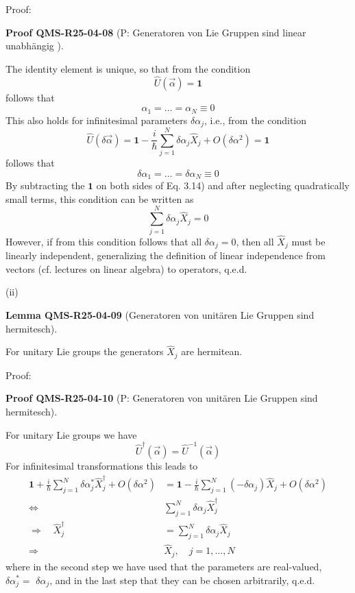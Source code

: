 \documentclass[10pt, letterpaper]{article}
\newcommand{\CustomHeading}[3]{%
  \par\medskip\noindent%
  \textbf{#1 #2} \textnormal{(#3)}.\enskip%
}
\newenvironment{LEM}[2]{\begin{unitbox}\CustomHeading{Lemma}{#1}{#2}}{\end{unitbox}}
\newenvironment{PROOF}[2]{\begin{unitbox}\CustomHeading{Proof}{#1}{#2}}{\end{unitbox}}
\begin{document}
Proof: 

\begin{PROOF}{QMS-R25-04-08}{P: Generatoren von Lie Gruppen sind linear unabhängig }
The identity element is unique, so that from the condition
$$
\hat{U}(\vec{\alpha})=\mathbf{1}
$$
follows that
$$
\alpha_{1}=\ldots=\alpha_{N} \equiv 0
$$
This also holds for infinitesimal parameters $\delta \alpha_{j}$, i.e., from the condition
$$
\hat{U}(\delta \vec{\alpha})=\mathbf{1}-\frac{i}{\hbar} \sum_{j=1}^{N} \delta \alpha_{j} \hat{X}_{j}+O\left(\delta \alpha^{2}\right)=\mathbf{1}
$$
follows that
$$
\delta \alpha_{1}=\ldots=\delta \alpha_{N} \equiv 0
$$
By subtracting the $\mathbf{1}$ on both sides of Eq. 3.14) and after neglecting quadratically small terms, this condition can be written as
$$
\sum_{j=1}^{N} \delta \alpha_{j} \hat{X}_{j}=0
$$
However, if from this condition follows that all $\delta \alpha_{j}=0$, then all $\hat{X}_{j}$ must be linearly independent, generalizing the definition of linear independence from vectors (cf. lectures on linear algebra) to operators, q.e.d.
\end{PROOF}


(ii) 


\begin{LEM}{QMS-R25-04-09}{Generatoren von unitären Lie Gruppen sind hermitesch}
For unitary Lie groups the generators $\hat{X}_{j}$ are hermitean.
\end{LEM}

Proof: 


\begin{PROOF}{QMS-R25-04-10}{P: Generatoren von unitären Lie Gruppen sind hermitesch}
For unitary Lie groups we have
$$
\hat{U}^{\dagger}(\vec{\alpha})=\hat{U}^{-1}(\vec{\alpha})
$$
For infinitesimal transformations this leads to
$$
\begin{aligned}
\mathbf{1}+\frac{i}{\hbar} \sum_{j=1}^{N} \delta \alpha_{j}^{*} \hat{X}_{j}^{\dagger}+O\left(\delta \alpha^{2}\right) & =\mathbf{1}-\frac{i}{\hbar} \sum_{j=1}^{N}\left(-\delta \alpha_{j}\right) \hat{X}_{j}+O\left(\delta \alpha^{2}\right) \\
\Longleftrightarrow & \sum_{j=1}^{N} \delta \alpha_{j} \hat{X}_{j}^{\dagger} \\
\Longrightarrow \quad \hat{X}_{j}^{\dagger} & =\sum_{j=1}^{N} \delta \alpha_{j} \hat{X}_{j} \\
\Longrightarrow \quad & \hat{X}_{j}, \quad j=1, \ldots, N
\end{aligned}
$$
where in the second step we have used that the parameters are real-valued, $\delta \alpha_{j}^{*}=$ $\delta \alpha_{j}$, and in the last step that they can be chosen arbitrarily, q.e.d.
\end{PROOF}
\end{document}
